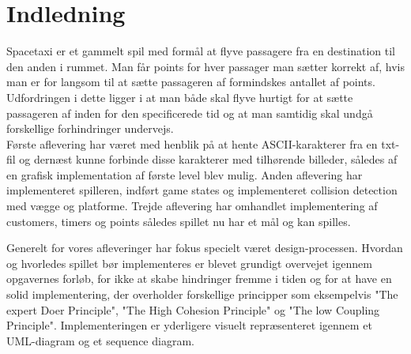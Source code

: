 

\section{Indledning}

Spacetaxi er et gammelt spil med formål at flyve passagere fra en destination til den anden i rummet. Man får points for hver passager man sætter korrekt af, hvis man er for langsom til at sætte passageren af formindskes antallet af points. Udfordringen i dette ligger i at man både skal flyve hurtigt for at sætte passageren af inden for den specificerede tid og at man samtidig skal undgå forskellige forhindringer undervejs.\\
Første aflevering har været med henblik på at hente ASCII-karakterer fra en txt-fil og dernæst kunne forbinde disse karakterer med tilhørende billeder, således af en grafisk implementation af første level blev mulig. Anden aflevering har implementeret spilleren, indført game states og implementeret collision detection med vægge og platforme. Trejde aflevering har omhandlet implementering af customers, timers og points således spillet nu har et mål og kan spilles.

Generelt for vores afleveringer har fokus specielt været design-processen. Hvordan og hvorledes spillet bør implementeres er blevet grundigt overvejet igennem opgavernes forløb, for ikke at skabe hindringer fremme i tiden og for at have en solid implementering, der overholder forskellige principper som eksempelvis "The expert Doer Principle", "The High Cohesion Principle" og "The low Coupling Principle".
Implementeringen er yderligere visuelt repræsenteret igennem et UML-diagram og et sequence diagram. 


